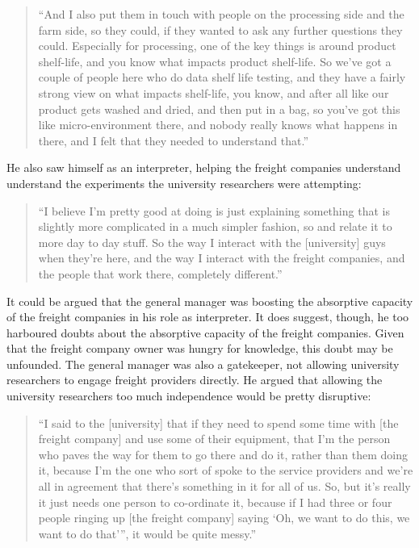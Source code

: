 \begin{quote}
\small
\enquote{And I also put them in touch with people on the processing side and the farm side, so they could, if they wanted to ask any further questions they could. Especially for processing, one of the key things is around product shelf-life, and you know what impacts product shelf-life. So we've got a couple of people here who do data shelf life testing, and they have a fairly strong view on what impacts shelf-life, you know, and after all like our product gets washed and dried, and then put in a bag, so you've got this like micro-environment there, and nobody really knows what happens in there, and I felt that they needed to understand that.} \\
\end{quote}

He also saw himself as an interpreter, helping the freight companies understand understand the experiments the university researchers were attempting: 

\begin{quote}
\small
\enquote{I believe I'm pretty good at doing is just explaining something that is slightly more complicated in a much simpler fashion, so and relate it to more day to day stuff. So the way I interact with the [university] guys when they're here, and the way I interact with the freight companies, and the people that work there, completely different.} \\
\end{quote}

It could be argued that the general manager was boosting the absorptive capacity of the freight companies in his role as interpreter. It does suggest, though, he too harboured doubts about the absorptive capacity of the freight companies. Given that the freight company owner was hungry for knowledge, this doubt may be unfounded. The general manager was also a gatekeeper, not allowing university researchers to engage freight providers directly. He argued that allowing the university researchers too much independence would be pretty disruptive: 

\begin{quote}
\small
\enquote{I said to the [university] that if they need to spend some time with [the freight company] and use some of their equipment, that I'm the person who paves the way for them to go there and do it, rather than them doing it, because I'm the one who sort of spoke to the service providers and we’re all in agreement that there's something in it for all of us. So, but it's really it just needs one person to co-ordinate it, because if I had three or four people ringing up [the freight company] saying \enquote{Oh, we want to do this, we want to do that}”, it would be quite messy.} \\
\end{quote}

